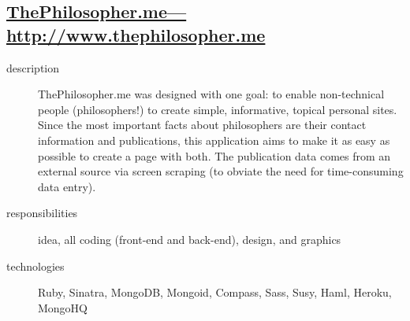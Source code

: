\documentclass{article}
\begin{document}

\subsection{\href{http://www.thephilosopher.me}
  {ThePhilosopher.me---http://www.thephilosopher.me}}
\label{sub:ThePhilosopher}

\begin{multicols}{2}

\begin{description}
  \item[description] ThePhilosopher.me was designed with one goal: to 
    enable non-technical people (philosophers!) to create simple, 
    informative, topical personal sites.  Since the most important 
    facts about philosophers are their contact information and 
    publications, this application aims to make it as easy as possible 
    to create a page with both.  The publication data comes from an 
    external source via screen scraping (to obviate the need for 
    time-consuming data entry).
  \item[responsibilities] idea, all coding (front-end and back-end), 
    design, and graphics
  \item[technologies] Ruby, Sinatra, MongoDB, Mongoid, Compass, Sass, 
    Susy, Haml, Heroku, MongoHQ
\end{description}

\vfill
\columnbreak
{}
\end{multicols}
\end{document}
